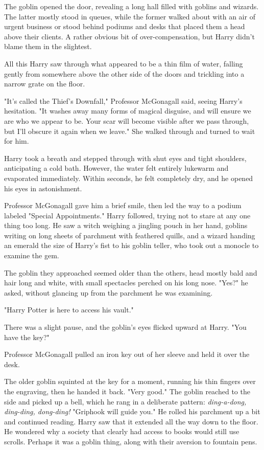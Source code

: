 The goblin opened the door, revealing a long hall filled with
goblins and wizards. The latter mostly stood in queues,
while the former walked about with an air of urgent
business or stood behind podiums and desks that placed
them a head above their clients. A rather obvious bit of
over-compensation, but Harry didn't blame them in the slightest.

All this Harry saw through what appeared to be a thin film
of water, falling gently from somewhere above the other
side of the doors and trickling into a narrow grate on the floor.

"It's called the Thief's Downfall," Professor McGonagall said,
seeing Harry's hesitation. "It washes away many forms of
magical disguise, and will ensure we are who we appear
to be. Your scar will become visible after we pass through,
but I'll obscure it again when we leave." She walked
through and turned to wait for him.

Harry took a breath and stepped through with shut eyes and tight
shoulders, anticipating a cold bath. However, the water felt entirely
lukewarm and evaporated immediately. Within seconds, he felt completely
dry, and he opened his eyes in astonishment.

Professor McGonagall gave him a brief smile, then led the
way to a podium labeled "Special Appointments." Harry
followed, trying not to stare at any one thing too long. He
saw a witch weighing a jingling pouch in her hand, goblins
writing on long sheets of parchment with feathered quills,
and a wizard handing an emerald the size of Harry's fist
to his goblin teller, who took out a monocle to examine the gem.

The goblin they approached seemed older than the others,
head mostly bald and hair long and white, with small
spectacles perched on his long nose. "Yes?" he asked,
without glancing up from the parchment he was examining.

"Harry Potter is here to access his vault."

There was a slight pause, and the goblin's eyes flicked
upward at Harry. "You have the key?"

Professor McGonagall pulled an iron key out of her sleeve
and held it over the desk.

The older goblin squinted at the key for a
moment, running his thin fingers over the engraving,
then he handed it back. "Very good." The goblin reached to
the side and picked up a bell, which he rang in a
deliberate pattern: \emph{ding-a-dong, ding-ding, dong-ding!}
"Griphook will guide you." He rolled his parchment up a bit
and continued reading. Harry saw that it extended all the
way down to the floor. He wondered why a society that
clearly had access to books would still use scrolls. Perhaps
it was a goblin thing, along with their aversion to fountain pens.

